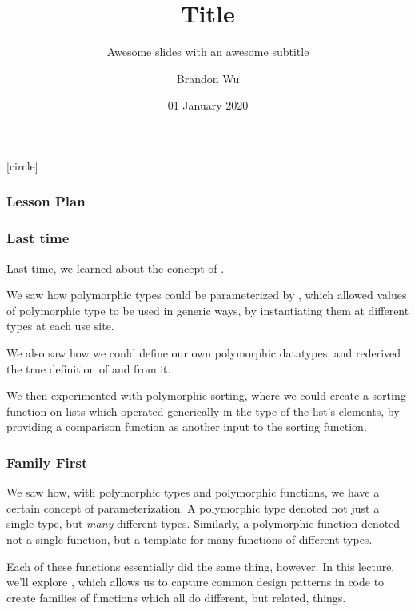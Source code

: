\documentclass[aspectratio=169]{beamer}
\title{Title} %
\subtitle{Awesome slides with an awesome subtitle} %
\date{01 January 2020} %
\author{Brandon Wu} %
\newif\ifcolorlambda
\begin{document}
\ifweb
    \renewcommand{\pause}{}
\fi

[circle]

{
\begin{frame}[plain]
    \colorlambdatrue
    \titlepage
\end{frame}
}

\begin{frame}[fragile]
  \frametitle{Lesson Plan}

  \tableofcontents
\end{frame}

\begin{frame}[fragile]
  \frametitle{Last time}

  Last time, we learned about the concept of .

  We saw how polymorphic types could be parameterized by , which
  allowed values of polymorphic type to be used in generic ways, by instantiating them
  at different types at each use site.

  We also saw how we could define our own polymorphic datatypes, and rederived the true
  definition of  and  from it.

  We then experimented with polymorphic sorting, where we could create a sorting function
  on lists which operated generically in the type of the list's elements, by providing
  a comparison function as another input to the sorting function. 
\end{frame}


\begin{frame}[fragile]
  \frametitle{Family First}

  We saw how, with polymorphic types and polymorphic functions, we have a certain concept
  of parameterization. A polymorphic type denoted not just a single type, but 
  \textit{many} different types. Similarly, a polymorphic function denoted not a single
  function, but a template for many functions of different types. 

  Each of these functions essentially did the same thing, however\footnotemark. In this
  lecture, we'll explore , which allows us to capture 
  common design patterns in code to create families of functions which all do different,
  but related, things. 

\end{frame}
\end{document}
